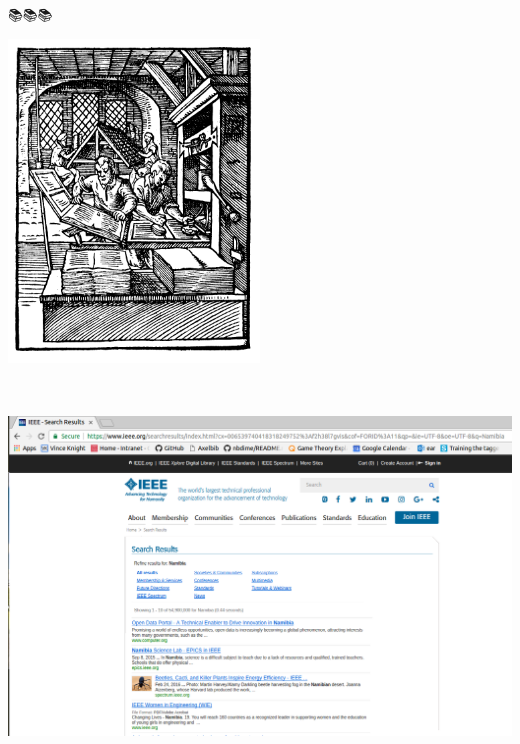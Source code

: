 \documentclass{beamer}
\begin{document}
\begin{frame}
    \begin{center}
    
    \end{center}
\end{frame}

\begin{frame}
\begin{center}
    \Huge{📚📚📚}
\end{center}
\end{frame}

\begin{frame}
\begin{center}
    \includegraphics[width=0.5\textwidth]{static/printing.png}
\end{center}
\end{frame}

\begin{frame}
    \begin{center}
    
    \end{center}
\end{frame}

\begin{frame}
\begin{center}
    \Huge{🏃🏃}
\end{center}
\end{frame}

\begin{frame}
\begin{center}
    \includegraphics[width=1\textwidth]{static/ieee_manual.png}
\end{center}
\end{frame}
\end{document}
